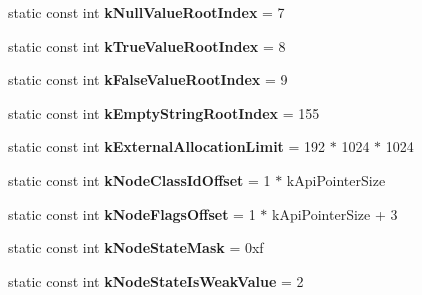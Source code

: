\begin{DoxyCompactItemize}
\item 
\hypertarget{classv8_1_1internal_1_1Internals_ab311cf753ec5c968052bd83ef21e83f8}{}static const int {\bfseries k\+Null\+Value\+Root\+Index} = 7\label{classv8_1_1internal_1_1Internals_ab311cf753ec5c968052bd83ef21e83f8}

\item 
\hypertarget{classv8_1_1internal_1_1Internals_a93abd58b178eca469bade28e68b5c59e}{}static const int {\bfseries k\+True\+Value\+Root\+Index} = 8\label{classv8_1_1internal_1_1Internals_a93abd58b178eca469bade28e68b5c59e}

\item 
\hypertarget{classv8_1_1internal_1_1Internals_a90b6837aa368bbe4ffd914e6f753b167}{}static const int {\bfseries k\+False\+Value\+Root\+Index} = 9\label{classv8_1_1internal_1_1Internals_a90b6837aa368bbe4ffd914e6f753b167}

\item 
\hypertarget{classv8_1_1internal_1_1Internals_a6f669f3d98fe653b281b26be3bc0655a}{}static const int {\bfseries k\+Empty\+String\+Root\+Index} = 155\label{classv8_1_1internal_1_1Internals_a6f669f3d98fe653b281b26be3bc0655a}

\item 
\hypertarget{classv8_1_1internal_1_1Internals_aa88e5a295f86584aa3e90ebc1a6c4739}{}static const int {\bfseries k\+External\+Allocation\+Limit} = 192 $\ast$ 1024 $\ast$ 1024\label{classv8_1_1internal_1_1Internals_aa88e5a295f86584aa3e90ebc1a6c4739}

\item 
\hypertarget{classv8_1_1internal_1_1Internals_af4fb6d499cb87f03031ad4d6be6bcd8f}{}static const int {\bfseries k\+Node\+Class\+Id\+Offset} = 1 $\ast$ k\+Api\+Pointer\+Size\label{classv8_1_1internal_1_1Internals_af4fb6d499cb87f03031ad4d6be6bcd8f}

\item 
\hypertarget{classv8_1_1internal_1_1Internals_aee5606f2a44d43d8dafe344e0bb753ef}{}static const int {\bfseries k\+Node\+Flags\+Offset} = 1 $\ast$ k\+Api\+Pointer\+Size + 3\label{classv8_1_1internal_1_1Internals_aee5606f2a44d43d8dafe344e0bb753ef}

\item 
\hypertarget{classv8_1_1internal_1_1Internals_a853acc088978d38a5a69091cf857a46d}{}static const int {\bfseries k\+Node\+State\+Mask} = 0xf\label{classv8_1_1internal_1_1Internals_a853acc088978d38a5a69091cf857a46d}

\item 
\hypertarget{classv8_1_1internal_1_1Internals_a8a5d4cc92a6952c2a50922c77a606e68}{}static const int {\bfseries k\+Node\+State\+Is\+Weak\+Value} = 2\label{classv8_1_1internal_1_1Internals_a8a5d4cc92a6952c2a50922c77a606e68}


\end{DoxyCompactItemize}

